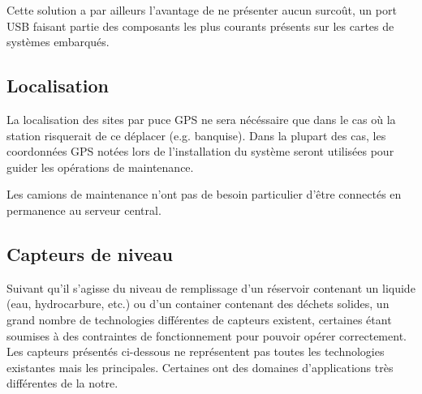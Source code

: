 Cette solution a par ailleurs l’avantage de ne présenter aucun surcoût, un port USB faisant partie des composants les plus courants présents sur les cartes de systèmes embarqués.

\subsection{Localisation}

La localisation des sites par puce GPS ne sera nécéssaire que dans le cas où la station risquerait de ce déplacer (e.g. banquise). Dans la plupart des cas, les coordonnées GPS notées lors de l’installation du système seront utilisées pour guider les opérations de maintenance.

Les camions de maintenance n'ont pas de besoin particulier d'être connectés en permanence au serveur central.


	 	

 

\subsection{Capteurs de niveau}

Suivant qu’il s’agisse du niveau de remplissage d’un réservoir contenant un liquide (eau, hydrocarbure, etc.) ou d’un container contenant des déchets solides, un grand nombre de technologies différentes de capteurs existent, certaines étant soumises à des contraintes de fonctionnement pour pouvoir opérer correctement.
Les capteurs présentés ci-dessous ne représentent pas toutes les technologies existantes mais les principales. Certaines ont des domaines d'applications très différentes de la notre.

